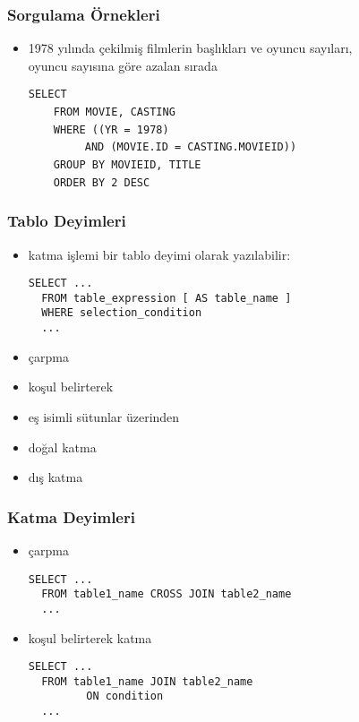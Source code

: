 \documentclass[dvipsnames]{beamer}
\theoremstyle{plain}
\begin{document}
\begin{frame}
  \frametitle{Sorgulama Örnekleri}
\begin{itemize}
    \item 1978 yılında çekilmiş filmlerin başlıkları ve oyuncu sayıları,\\
      oyuncu sayısına göre azalan sırada

    \medskip
\lstinline!SELECT! \\
~~~~\lstinline!FROM MOVIE, CASTING!\\
\pause
~~~~\lstinline!WHERE ((YR = 1978)!\\
~~~~~~~~~\lstinline!AND (MOVIE.ID = CASTING.MOVIEID))!\\
\pause
~~~~\lstinline!GROUP BY MOVIEID, TITLE!\\
\pause\pause
~~~~\lstinline!ORDER BY 2 DESC!
  \end{itemize}
\end{frame}

\begin{frame}[fragile]
  \frametitle{Tablo Deyimleri}

  \begin{itemize}
    \item katma işlemi bir tablo deyimi olarak yazılabilir:
    \begin{lstlisting}
SELECT ...
  FROM table_expression [ AS table_name ]
  WHERE selection_condition
  ...
    \end{lstlisting}
    \medskip
    \item çarpma
    \item koşul belirterek
    \item eş isimli sütunlar üzerinden
    \item doğal katma
    \item dış katma
  \end{itemize}
\end{frame}

\begin{frame}[fragile]
  \frametitle{Katma Deyimleri}

  \begin{itemize}
    \item çarpma
   \begin{lstlisting}
SELECT ...
  FROM table1_name CROSS JOIN table2_name
  ...
    \end{lstlisting}

  \pause
  \medskip
  \item koşul belirterek katma
    \begin{lstlisting}
SELECT ...
  FROM table1_name JOIN table2_name
         ON condition
  ...
    \end{lstlisting}
  \end{itemize}
\end{frame}
\end{document}
